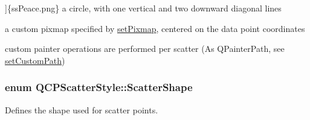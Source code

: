 \begin{Desc}
\begin{description}
{}]\{ss\+Peace.\+png\} a circle, with one vertical and two downward diagonal lines \item[{\em 
ss\+Pixmap\hypertarget{class_q_c_p_scatter_style_adb31525af6b680e6f1b7472e43859349a0e709ca8b00ac857a65459d63cc94521}{}\label{class_q_c_p_scatter_style_adb31525af6b680e6f1b7472e43859349a0e709ca8b00ac857a65459d63cc94521}
}]a custom pixmap specified by \hyperlink{class_q_c_p_scatter_style_a5fb611d46acfac520d7b89a1c71d9246}{set\+Pixmap}, centered on the data point coordinates \item[{\em 
ss\+Custom\hypertarget{class_q_c_p_scatter_style_adb31525af6b680e6f1b7472e43859349a1c9c14e274bd8b10a9e0bb2a4c73f597}{}\label{class_q_c_p_scatter_style_adb31525af6b680e6f1b7472e43859349a1c9c14e274bd8b10a9e0bb2a4c73f597}
}]custom painter operations are performed per scatter (As Q\+Painter\+Path, see \hyperlink{class_q_c_p_scatter_style_a96a3e949f90b2afe5677ca9412a12a1e}{set\+Custom\+Path}) \end{description}
\end{Desc}
\subsubsection[{\texorpdfstring{Scatter\+Shape}{ScatterShape}}]{\setlength{\rightskip}{0pt plus 5cm}enum {\bf Q\+C\+P\+Scatter\+Style\+::\+Scatter\+Shape}}\hypertarget{class_q_c_p_scatter_style_adb31525af6b680e6f1b7472e43859349}{}\label{class_q_c_p_scatter_style_adb31525af6b680e6f1b7472e43859349}
Defines the shape used for scatter points.


